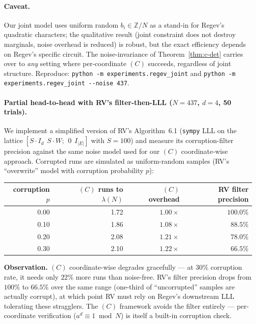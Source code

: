 \documentclass[11pt]{article}
\begin{document}
\paragraph{Caveat.} Our joint model uses uniform random $b_i \in \mathbb{Z}/N$ as a stand-in for Regev's quadratic characters; the qualitative result (joint constraint does not destroy marginals, noise overhead is reduced) is robust, but the exact efficiency depends on Regev's specific circuit. The noise-invariance of Theorem~\ref{thm:c-det} carries over to \emph{any} setting where per-coordinate $(C)$ succeeds, regardless of joint structure. Reproduce: \texttt{python -m experiments.regev\_joint} and \texttt{python -m experiments.regev\_joint -{}-noise 437}.

\paragraph{Partial head-to-head with RV's filter-then-LLL ($N = 437$, $d = 4$, 50 trials).}
We implement a simplified version of RV's Algorithm~6.1 (\texttt{sympy} LLL on the lattice $[S \cdot I_d \ \ S \cdot W ; \ \ 0 \ \ I_{|E|}]$ with $S = 100$) and measure its corruption-filter precision against the same noise model used for our $(C)$ coordinate-wise approach. Corrupted runs are simulated as uniform-random samples (RV's ``overwrite'' model with corruption probability $p$):

\begin{center}
\begin{tabular}{rrrr}
\toprule
corruption $p$ & $(C)$ runs to $\lambda(N)$ & $(C)$ overhead & RV filter precision \\
\midrule
0.00 & 1.72 & $1.00\times$ & $100.0\%$ \\
0.10 & 1.86 & $1.08\times$ & $88.5\%$ \\
0.20 & 2.08 & $1.21\times$ & $78.0\%$ \\
0.30 & 2.10 & $1.22\times$ & $66.5\%$ \\
\bottomrule
\end{tabular}
\end{center}

\textbf{Observation.} $(C)$ coordinate-wise degrades gracefully --- at $30\%$ corruption rate, it needs only $22\%$ more runs than noise-free. RV's filter precision drops from $100\%$ to $66.5\%$ over the same range (one-third of ``uncorrupted'' samples are actually corrupt), at which point RV must rely on Regev's downstream LLL tolerating these stragglers. The $(C)$ framework avoids the filter entirely --- per-coordinate verification ($a^d \equiv 1 \bmod N$) is itself a built-in corruption check.
\end{document}
